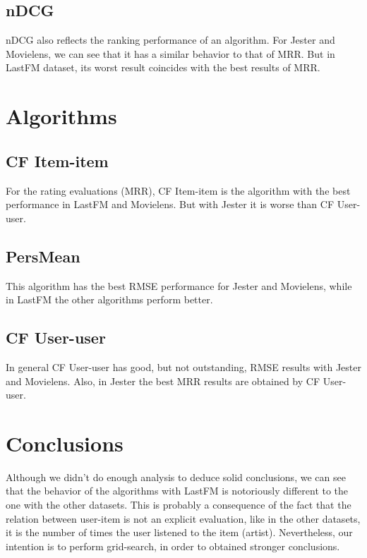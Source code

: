 \documentclass[a4paper]{article}
\begin{document}

\subsection{nDCG}
nDCG also reflects the ranking performance of an algorithm. For Jester and Movielens, we can see that it has a similar behavior to that of MRR. But in LastFM dataset, its worst result coincides with the best results of MRR.

\section{Algorithms}
\subsection{CF Item-item}
For the rating evaluations (MRR), CF Item-item is the algorithm with the best performance in LastFM and Movielens. But with Jester it is worse than CF User-user.

\subsection{PersMean}
This algorithm has the best RMSE performance for Jester and Movielens, while in LastFM the other algorithms perform better.

\subsection{CF User-user}
In general CF User-user has good, but not outstanding, RMSE results with Jester and Movielens. Also, in Jester the best MRR results are obtained by CF User-user.



\section{Conclusions}
Although we didn't do enough analysis to deduce solid conclusions, we can see that the behavior of the algorithms with LastFM is notoriously different to the one with the other datasets. This is probably a consequence of the fact that the relation between user-item is not an explicit evaluation, like in the other datasets, it is the number of times the user listened to the item (artist).
Nevertheless, our intention is to perform grid-search, in order to obtained stronger conclusions.
\end{document}
